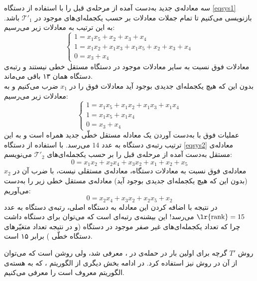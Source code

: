 \begin{example}[\lr{$T'$-Methode}]
  	سه معادله‌ی جدید به‌دست  آمده از مرحله‌ی قبل را با استفاده از دستگاه 
  	\ref{eqsys1}
  	بازنویسی می‌کنیم تا تمام جملات معادلات بر حسب یکجمله‌ای‌های موجود در 
  	$\mathcal{T}'_{1}$
  	باشد. به این ترتیب به معادلات زیر می‌رسیم:
  	\begin{equation}
  	\label{eqsys6}
  	\left \{ \begin{array}{l}
  	1 = x_1 x_5 + x_2 + x_3 + x_4\\
  	1 = x_1 x_2 + x_1 x_3 + x_1 x_5 + x_2 + x_3 + x_4\\
  	0 = x_3 + x_4
  	\end{array} \right.
  	\end{equation}
  	معادلات فوق نسبت به  سایر معادلات موجود در دستگاه  مستقل خطی نیستند و رتبه‌ی دستگاه همان ۱۳ باقی‌ می‌ماند.\\
  	بدون این که هیچ یکجمله‌ای جدیدی بوجود آید معادلات فوق را در 
  	$x_{1}$
  	ضرب می‌کنیم و به معادلات زیر می‌رسیم:
  	\begin{equation}
  	\label{eqsys6}
  	\left \{ \begin{array}{l}
  	1 = x_1 x_5 + x_1 x_2 + x_1 x_3 + x_1 x_4\\
  	1 = x_1 x_5 + x_1 x_4\\
  	0 = x_3 + x_4
  	\end{array} \right.
  	\end{equation}
  	عملیات فوق با به‌دست  آوردن یک معادله مستقل خطّی جدید همراه است و به این ترتیب رتبه‌ی دستگاه به عدد 
  	$14$
  	می‌رسد. با استفاده از دستگاه 
  	\ref{eqsys2}
  	معادله‌ی مستقل به‌دست  آمده از مرحله‌ی قبل را بر حسب یکجمله‌ای‌های 
  	$\mathcal{T}'_{2}$
  	می‌نویسم:
  	$$0 = x_1 x_2 + x_2 x_4 + x_3 x_2 + x_1 + x_2 + x_5 $$
  	معادله‌ی فوق نسبت به معادلات دستگاه، معادله‌ی مستقلی نیست، با ضرب آن در 
  	$x_{2}$
  	(بدون این که هیچ یکجمله‌ای جدیدی بوجود آید) معادله‌ی مستقل خطی زیر را به‌دست  می‌آوریم:
  	$$0 = x_2 x_4 + x_3 x_2 + x_2 x_5 + x_2$$
  	در نتیجه با اضافه کردن این معادله به دستگاه اصلی، رتبه‌ی دستگاه به عدد 
  	$\text{\lr{rank}} = 15$
  	می‌رسد!  این بیشنه‌ی رتبه‌ای است که می‌توان برای دستگاه داشت چرا که تعداد یکجمله‌ای‌های غیر صفر موجود در دستگاه (و در نتیجه تعداد متغیّر‌های دستگاه خطّی ) برابر ۱۵ است. 
\end{example}
روش 
$T'$
گرچه برای اولین بار در حمله‌ی 
در 
\cite{courtois2002cryptanalysis}
، معرفی شد، ولی روشن است که می‌توان از آن در روش 
نیز استفاده کرد. در ادامه بخش دیگری از الگوریتم 
، که به هسته‌ی الگوریتم معروف است را معرفی می‌کنیم.


